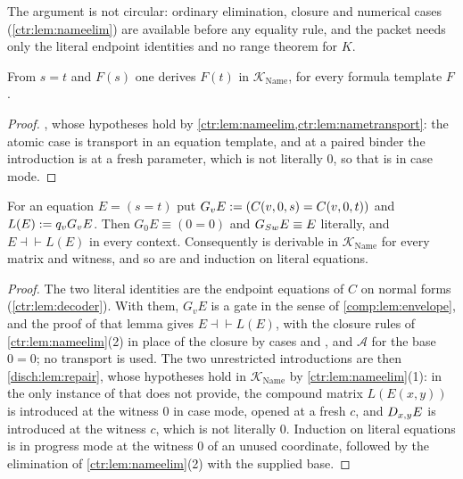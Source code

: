 The argument is not circular: ordinary elimination, closure and numerical cases
(\cref{ctr:lem:nameelim}) are available before any equality rule, and the packet needs only
the literal endpoint identities and no range theorem for $K$.

\begin{lemma}\label{ctr:lem:nameformula}
From $s=t$ and $F(s)$ one derives $F(t)$ in $\mathcal K_{\mathrm{Name}}$, for every formula
template $F$.
\end{lemma}
\begin{proof}
, whose hypotheses hold by
\cref{ctr:lem:nameelim,ctr:lem:nametransport}: the atomic case is transport in an equation
template, and at a paired binder the introduction is at a fresh parameter, which is not
literally $0$, so that  is in case mode.
\end{proof}

\begin{lemma}\label{ctr:lem:envelope}
For an equation $E=(s=t)$ put $G_vE\mathrel{:=}(C(v,0,s)=C(v,0,t))$ and
$L(E)\mathrel{:=} q_vG_vE$. Then $G_0E\equiv(0=0)$ and $G_{S w}E\equiv E$ literally, and
$E\dashv\vdash L(E)$ in every context. Consequently  is derivable in
$\mathcal K_{\mathrm{Name}}$ for every matrix and witness, and so are  and
induction on literal equations.
\end{lemma}
\begin{proof}
The two literal identities are the endpoint equations of $C$ on normal forms
(\cref{ctr:lem:decoder}). With them, $G_vE$ is a gate in the sense of
\cref{comp:lem:envelope}, and the proof of that lemma gives $E\dashv\vdash L(E)$, with the
closure rules of \cref{ctr:lem:nameelim}(2) in place of the closure by cases and
, and $\mathcal A$ for the base $0=0$; no transport is used. The two
unrestricted introductions are then \cref{disch:lem:repair}, whose hypotheses hold in
$\mathcal K_{\mathrm{Name}}$ by \cref{ctr:lem:nameelim}(1): in the only instance of
 that  does not provide, the compound matrix $L(E(x,y))$ is
introduced at the witness $0$ in case mode, opened at a fresh $c$, and $D_{x,y}E$ is
introduced at the witness $c$, which is not literally $0$. Induction on literal equations is
 in progress mode at the witness $0$ of an unused coordinate, followed by the
elimination of \cref{ctr:lem:nameelim}(2) with the supplied base.
\end{proof}

